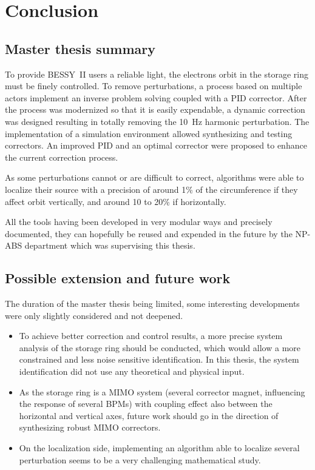 
\chapter{Conclusion}
\label{sec:conclusion}
\section{Master thesis summary}
To provide BESSY~II users a reliable light, the electrons orbit in the storage ring must be finely controlled. To remove perturbations, a process based on multiple actors implement an inverse problem solving coupled with a PID corrector. After the process was modernized so that it is easily expendable, a dynamic correction was designed resulting in totally removing the \SI{10}{\hertz} harmonic perturbation. The implementation of a simulation environment allowed synthesizing and testing correctors. An improved PID and an optimal corrector were proposed to enhance the current correction process.

As some perturbations cannot or are difficult to correct, algorithms were able to localize their source with a precision of around 1\% of the circumference if they affect orbit vertically, and around 10 to 20\% if horizontally.

All the tools having been developed in very modular ways and precisely documented, they can hopefully be reused and expended in the future by the NP-ABS department which was supervising this thesis.

\section{Possible extension and future work}

The duration of the master thesis being limited, some interesting developments were only slightly considered and not deepened.

\begin{itemize}
    \item To achieve better correction and control results, a more precise system analysis of the storage ring should be conducted, which would allow a more constrained and less noise sensitive identification.  In this thesis, the system identification did not use any theoretical and physical input.
    \item As the storage ring is a MIMO system (several corrector magnet, influencing the response of several BPMs) with coupling effect also between the horizontal and vertical axes, future work should go in the direction of synthesizing robust MIMO correctors.
    \item On the localization side, implementing an algorithm able to localize several perturbation seems to be a very challenging mathematical study.
\end{itemize}